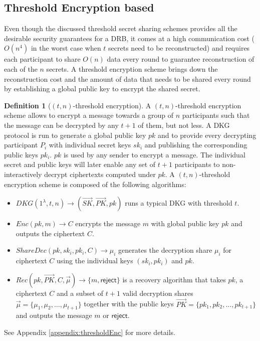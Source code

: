 \documentclass[letterpaper,twocolumn,10pt]{article}
\theoremstyle{definition}
\newtheorem{definition}[theorem]{Definition}
\theoremstyle{remark}
\begin{document}
\subsection{Threshold Encryption based}
Even though the discussed threshold secret sharing schemes provides all the desirable security guarantees for a DRB, it comes at a high communication cost ($O(n^4)$ in the worst case when $t$ secrets need to be reconstructed) and requires each participant to share $O(n)$ data every round to guarantee reconstruction of each of the $n$ secrets. A threshold encryption scheme brings down the reconstruction cost and the amount of data that needs to be shared every round by establishing a global public key to encrypt the shared secret.
\begin{definition}[$(t, n)$-threshold encryption] 
A $(t, n)$-threshold encryption scheme allows to encrypt a message towards a group of $n$ participants such that the message can be decrypted by any $t+1$ of them, but not less. A DKG protocol is run to generate a global public key $pk$ and to provide every decrypting participant $P_i$ with individual secret keys $sk_i$ and publishing the corresponding public keys $pk_i$. $pk$ is used by any sender to encrypt a message. The individual secret and public keys will later enable any set of $t + 1$ participants to non-interactively decrypt ciphertexts computed under $pk$. A $(t, n)$-threshold encryption scheme is composed of the following algorithms:
\begin{itemize}
    \item $DKG(1^\lambda, t, n) \rightarrow (\vec{SK}, \vec{PK}, pk)$ runs a typical DKG with threshold $t$.
    \item $Enc(pk, m) \rightarrow C$ encrypts the message $m$ with global public key $pk$ and outputs the ciphertext $C$.
    \item $ShareDec(pk, sk_i, pk_i, C) \rightarrow \mu_i$ generates the decryption share $\mu_i$ for ciphertext $C$ using the individual keys $(sk_i, pk_i)$ and $pk$.
    \item $Rec(pk, \vec{PK}, C, \vec{\mu} )\rightarrow \{m, \mathsf{reject}\}$ is a recovery algorithm that takes $pk$, a ciphertext $C$ and a subset of $t+1$ valid decryption shares $\vec{\mu} = \{\mu_1, \mu_2,\ldots, \mu_{t+1}\}$ together with the public keys $\vec{PK} = \{pk_1, pk_2,\ldots, pk_{t+1}\}$ and outputs the message $m$ or $\mathsf{reject}$.
\end{itemize}
See Appendix \ref{appendix:thresholdEnc} for more details.
\end{definition}
\end{document}
